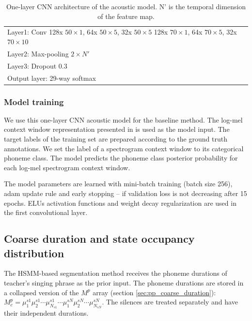 \begin{table}[ht!]
\centering
\caption{One-layer CNN architecture of the acoustic model. N' is the temporal dimension of the feature map.}
\label{table:ch5:cnn_acoustic_model}
\begin{tabular}{l}
\toprule
\makecell[l]{Layer1: Conv 128x $50{\times}1$, 64x $50{\times}5$, 32x $50{\times}5$\\128x $70{\times}1$, 64x $70{\times}5$, 32x $70{\times}10$} \\
Layer2: Max-pooling $2{\times}N'$ \\
Layer3: Dropout 0.3\\
Output layer: 29-way softmax\\
\bottomrule
\end{tabular}
\end{table}

\subsubsection{Model training}

We use this one-layer CNN acoustic model for the baseline method. The log-mel context window representation presented in  is used as the model input. The target labels of the training set are prepared according to the ground truth annotations. We set the label of a spectrogram context window to its categorical phoneme class. The model predicts the phoneme class posterior probability for each log-mel spectrogram context window.

The model parameters are learned with mini-batch training (batch size 256), adam \cite{kingma2014adam} update rule and early stopping -- if validation loss is not decreasing after 15 epochs. ELUs activation functions and weight decay regularization are used in the first convolutional layer.

\subsection{Coarse duration and state occupancy distribution}

The HSMM-based segmentation method receives the phoneme durations of teacher's singing phrase as the prior input. The phoneme durations are stored in a collapsed version of the $M^p$ array (section \ref{sec:pp_coarse_duration}): $M_c^p=\mu_{1}^{s1} \mu_{2}^{s1} \cdots \mu_{N_{s1}}^{s1} \cdots \mu_{1}^{sN} \mu_{2}^{sN} \cdots \mu_{N_{sN}}^{sN}$. The silences are treated separately and have their independent durations.

